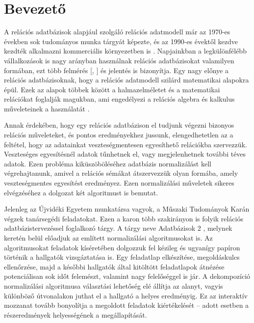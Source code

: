 \chapter{Bevezető}

A relációs adatbázisok alapjául szolgáló relációs adatmodell már az 1970-es években sok tudományos munka tárgyát képezte, és az 1990-es évektől kezdve kezdték alkalmazni kommerciális környezetben is \parencite{mogin1996}. Napjainkban a legkülönfélébb vállalkozások is nagy arányban használnak relációs adatbázisokat valamilyen formában, ezt több felmérés [\parencite{scalegrid2019}, \parencite{ramel2015}] és jelentés \parencite{loukides2022} is bizonyítja. Egy nagy előnye a relációs adatbázisoknak, hogy a relációs adatmodell szilárd matematikai alapokra épül. Ezek az alapok többek között a halmazelméletet és a matematikai relációkat foglalják magukban, ami engedélyezi a relációs algebra és kalkulus műveleteinek a használatát \parencite{mogin1996}.

Annak érdekében, hogy egy relációs adatbázison el tudjunk végezni bizonyos relációs műveleteket, és pontos eredményekhez jussunk, elengedhetetlen az a feltétel, hogy az adatainkat veszteségmentesen egyesíthető relációkba szervezzük. Veszteséges egyesítésnél adatok tűnhetnek el, vagy megjelenhetnek további téves adatok. Ezen probléma kiküszöböléséhez adatbázis normalizálást kell végrehajtanunk, amivel a relációs sémákat átszervezzük olyan formába, amely veszteségmentes egyesítést eredményez. Ezen normalizálási műveletek sikeres elvégzéséhez a dolgozat két algoritmust is bemutat.

Jelenleg az Újvidéki Egyetem munkatársa vagyok, a Műszaki Tudományok Karán végzek tanársegédi feladatokat. Ezen a karon több szakirányon is folyik relációs adatbázistervezéssel foglalkozó tárgy. A tárgy neve Adatbázisok 2 \parencite{ftn2021}, melynek keretén belül előadjuk az említett normalizálási algoritmusokat is. Az algoritmusokat feladatok kíséretében dolgozzuk fel kézileg és ugyanígy papíron történik a hallgatók vizsgáztatása is. Egy feladatlap elkészítése, megoldáskulcs ellenőrzése, majd a későbbi hallgatók által kitöltött feladatlapok átnézése potenciálisan sok időt felemészt, valamint nagy felelőséggel is jár. A dekompozíció normalizálási algoritmusa választási lehetőség elé állítja az alanyt, vagyis különböző útvonalakon juthat el a hallgató a helyes eredményig. Ez az interaktív mozzanat tovább bonyolítja a megoldott feladatok kiértékelését – adott esetben a részeredmények helyességének a megállapítását.


